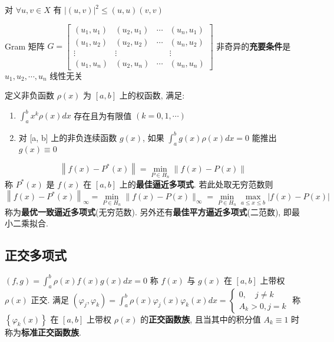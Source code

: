 \documentclass[10pt]{yerbaformat}
\begin{document}
\begin{theorem}
    对 $\forall u, v \in X$ 有 $|(u, v)|^{2} \leq(u, u)(v, v)$
\end{theorem}

\begin{theorem}
    Gram 矩阵 $G=\left[\begin{array}{cccc}
                \left(u_{1}, u_{1}\right) & \left(u_{2}, u_{1}\right) & \cdots & \left(u_{n}, u_{1}\right) \\
                \left(u_{1}, u_{2}\right) & \left(u_{2}, u_{2}\right) & \cdots & \left(u_{n}, u_{2}\right) \\
                \vdots                    & \vdots                    &        & \vdots                    \\
                \left(u_{1}, u_{n}\right) & \left(u_{2}, u_{n}\right) & \cdots & \left(u_{n}, u_{n}\right)
            \end{array}\right]$ 非奇异的\textbf{充要条件}是$u_{1}, u_{2}, \cdots, u_{n}$ 线性无关
\end{theorem}

\begin{definition}[权函数]
    定义非负函数 $\rho (x)$ 为 $[a,b]$ 上的权函数, 满足:
    \begin{enumerate}
        \item $\int_{a}^{b} x^{k} \rho(x) d x$ 存在且为有限值 $(k=0,1, \cdots)$
        \item 对 [a, b] 上的非负连续函数 $g(x)$, 如果 $\int_{a}^{b} g(x) \rho(x) d x=0$ 能推出$g(x) \equiv 0$
    \end{enumerate}
\end{definition}

\begin{definition}[最佳逼近]
    $$\left\|f(x)-P^{*}(x)\right\|=\min _{P \in H_{n}}\|f(x)-P(x)\|$$ 称 $P^{*}(x)$ 是 $f(x)$ 在 $[a, b]$ 上的\textbf{最佳逼近多项式}. 若此处取无穷范数则 $$\left\|f(x)-P^{*}(x)\right\|_{\infty} =\min _{P \in H_{n}}\|f(x)-P(x)\|_{\infty} =\min _{P \in H_{n}} \max _{a \leq x \leq b}|f(x)-P(x)|$$ 称为\textbf{最优一致逼近多项式}(无穷范数). 另外还有\textbf{最佳平方逼近多项式}(二范数), 即最小二乘拟合.
\end{definition}

\subsection{正交多项式}
\begin{definition}
    $(f, g)=\int_{a}^{b} \rho(x) f(x) g(x) d x=0$ 称 $f(x)$ 与 $g(x)$ 在 $[a, b]$ 上带权 $\rho(x)$ 正交. 满足 $\left(\varphi_{j}, \varphi_{k}\right)=\int_{a}^{b} \rho(x) \varphi_{j}(x) \varphi_{k}(x) d x=\left\{\begin{array}{l}0, \quad j \neq k \\ A_{k}>0, j=k\end{array}\right.$ 称 $\left\{\varphi_{k}(x)\right\}$ 在 $[a, b]$ 上带权 $\rho(x)$ 的\textbf{正交函数族}, 且当其中的积分值 $A_{k} \equiv 1$ 时称为\textbf{标准正交函数族}.
\end{definition}
\end{document}
